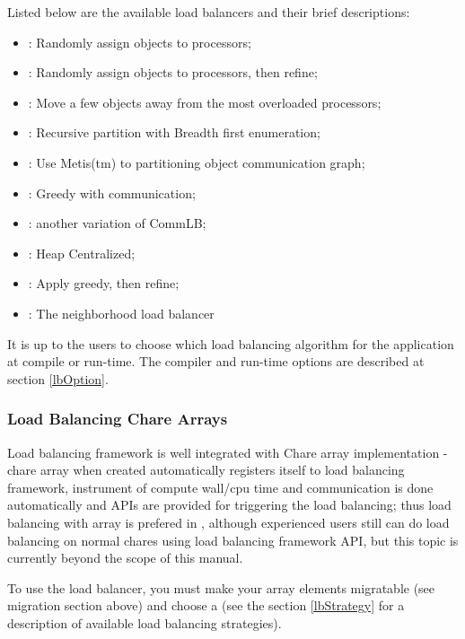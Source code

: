 Listed below are the available load balancers and their brief 
descriptions:
\begin{itemize}
\item {}:   Randomly assign objects to processors;
\item {}:    Randomly assign objects to processors, then refine;
\item {}:     Move a few objects away from the most overloaded processors;
\item {}:        Recursive partition with Breadth first enumeration;
\item {}:      Use Metis(tm) to partitioning object communication graph;
\item {}:       Greedy with communication;
\item {}:      another variation of CommLB;
\item {}:   Heap Centralized;
\item {}:  Apply greedy, then refine;
\item {}:   The neighborhood load balancer
\end{itemize}

It is up to the users to choose which load balancing algorithm for the 
application at compile or run-time. The compiler and run-time options 
are described at section \ref{lbOption}.

\subsubsection{Load Balancing Chare Arrays}
\label{lbarray}

Load balancing framework is well integrated with Chare array implementation - 
chare array when created automatically registers itself to load balancing
framework, instrument of compute wall/cpu time and communication is 
done automatically and APIs are provided for triggering the load balancing; 
thus load balancing with array is prefered in \charmpp{}, although 
experienced users still can do load balancing on normal chares using load 
balancing framework API, but this topic is currently beyond the scope of 
this manual.

To use the load balancer, you must make your array elements migratable
(see migration section above) and choose a  
(see the section \ref{lbStrategy} for a description
of available load balancing strategies).

